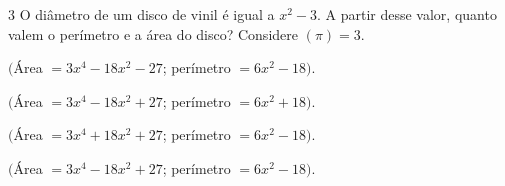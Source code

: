 {%









\num{3} O diâmetro de um disco de vinil é igual a $x^2 - 3$. A partir desse
valor, quanto valem o perímetro e a área do disco? Considere $(\pi) = 3$.

\begin{escolha}[itemsep=0pt]
\item $($Área $= 3x^4 - 18x^2 - 27$; perímetro $= 6x^2 - 18)$.
\item $($Área $= 3x^4 - 18x^2 + 27$; perímetro $= 6x^2 + 18)$.
\item $($Área $= 3x^4 + 18x^2 + 27$; perímetro $= 6x^2 - 18)$.
\item  $($Área $= 3x^4 - 18x^2 + 27$; perímetro $= 6x^2 - 18)$.
\end{escolha}







}
